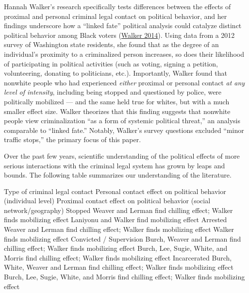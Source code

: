 \documentclass[
  12pt,
]{article}
\begin{document}
Hannah Walker's research specifically tests differences between the effects of proximal and personal criminal legal contact on political behavior, and her findings underscore how a ``linked fate'' political analysis could catalyze distinct political behavior among Black voters (\protect\hyperlink{ref-Walker2014}{Walker 2014}). Using data from a 2012 survey of Washington state residents, she found that as the degree of an individual's proximity to a criminalized person increases, so does their likelihood of participating in political activities (such as voting, signing a petition, volunteering, donating to politicians, etc.). Importantly, Walker found that nonwhite people who had experienced \emph{either} proximal or personal contact \emph{at any level of intensity}, including being stopped and questioned by police, were politically mobilized --- and the same held true for whites, but with a much smaller effect size. Walker theorizes that this finding suggests that nonwhite people view criminalization ``as a form of systemic political threat,'' an analysis comparable to ``linked fate.'' Notably, Walker's survey questions excluded ``minor traffic stops,'' the primary focus of this paper.

Over the past few years, scientific understanding of the political effects of more serious interactions with the criminal legal system has grown by leaps and bounds. The following table summarizes our understanding of the literature.

Type of criminal legal contact
Personal contact effect on political behavior (individual level)
Proximal contact effect on political behavior (social network/geography)
Stopped
Weaver and Lerman find chilling effect; Walker finds mobilizing effect
Laniyonu and Walker find mobilizing effect
Arrested
Weaver and Lerman find chilling effect; Walker finds mobilizing effect
Walker finds mobilizing effect
Convicted / Supervision
Burch, Weaver and Lerman find chilling effect; Walker finds mobilizing effect
Burch, Lee, Sugie, White, and Morris find chilling effect; Walker finds mobilizing effect
Incarcerated
Burch, White, Weaver and Lerman find chilling effect; Walker finds mobilizing effect
Burch, Lee, Sugie, White, and Morris find chilling effect; Walker finds mobilizing effect
\end{document}
